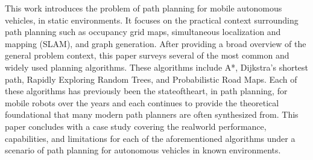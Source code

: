 This work introduces the problem of path planning for mobile autonomous vehicles, in static environments. It focuses on the practical context surrounding path planning such as occupancy grid maps, simultaneous localization and mapping (SLAM), and graph generation. After providing a broad overview of the general problem context, this paper surveys several of the most common and widely used planning algorithms. These algorithms include A*, Dijkstra's shortest path, Rapidly Exploring Random Trees, and Probabilistic Road Maps. Each of these algorithms has previously been the stateoftheart, in path planning, for mobile robots over the years and each continues to provide the theoretical foundational that many modern path planners are often synthesized from. This paper concludes with a case study covering the realworld performance, capabilities, and limitations for each of the aforementioned algorithms under a scenario of path planning for autonomous vehicles in known environments.